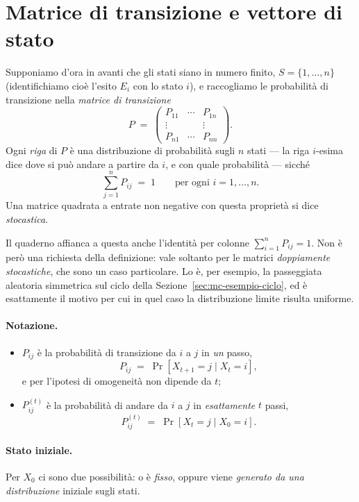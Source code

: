 \section{Matrice di transizione e vettore di stato}

Supponiamo d'ora in avanti che gli stati siano in numero finito, $S = \{1, \dots, n\}$
(identifichiamo cioè l'esito $E_i$ con lo stato $i$), e raccogliamo le probabilità di
transizione nella \emph{matrice di transizione}
\[
  P \;=\;
  \begin{pmatrix}
    P_{11} & \cdots & P_{1n} \\
    \vdots &        & \vdots \\
    P_{n1} & \cdots & P_{nn}
  \end{pmatrix}.
\]
Ogni \emph{riga} di $P$ è una distribuzione di probabilità sugli $n$ stati — la riga
$i$-esima dice dove si può andare a partire da $i$, e con quale probabilità — sicché
\[
  \sum_{j=1}^{n} P_{ij} \;=\; 1 \qquad \text{per ogni } i = 1, \dots, n .
\]
Una matrice quadrata a entrate non negative con questa proprietà si dice
\emph{stocastica}.

\begin{osservazione}
  Il quaderno affianca a questa anche l'identità per colonne $\sum_{i=1}^{n} P_{ij} = 1$.
  Non è però una richiesta della definizione: vale soltanto per le matrici
  \emph{doppiamente stocastiche}, che sono un caso particolare. Lo è, per esempio, la
  passeggiata aleatoria simmetrica sul ciclo della Sezione~\ref{sec:mc-esempio-ciclo}, ed è
  esattamente il motivo per cui in quel caso la distribuzione limite risulta uniforme.
\end{osservazione}

\paragraph{Notazione.}
\begin{itemize}
  \item $P_{ij}$ è la probabilità di transizione da $i$ a $j$ in \emph{un} passo,
        \[
          P_{ij} \;=\; \Pr[X_{t+1} = j \mid X_t = i],
        \]
        e per l'ipotesi di omogeneità non dipende da $t$;
  \item $P^{(t)}_{ij}$ è la probabilità di andare da $i$ a $j$ in \emph{esattamente}
        $t$ passi,
        \[
          P^{(t)}_{ij} \;=\; \Pr[X_t = j \mid X_0 = i].
        \]
\end{itemize}

\paragraph{Stato iniziale.} Per $X_0$ ci sono due possibilità: o è \emph{fisso},
oppure viene \emph{generato da una distribuzione} iniziale sugli stati.

